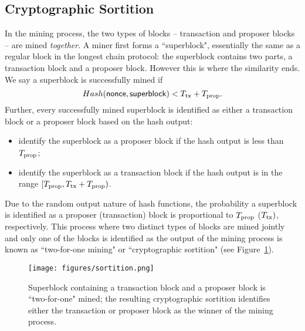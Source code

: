 \documentclass{article}
\begin{document}
\subsection*{Cryptographic Sortition}
In the mining process, the two types of blocks -- transaction and proposer blocks -- are mined {\em together}. A miner first forms a ``superblock", essentially the same as a regular block in the longest chain protocol: the superblock contains two parts, a  transaction block and a  proposer block.   However this is where the similarity ends. We say a superblock is successfully  mined if 
\begin{equation}
    Hash({\sf nonce}, {\sf superblock}) < T_{\rm tx} + T_{\rm prop}. 
\label{eq:sortition}
\end{equation}
Further, every successfully mined superblock is identified as either a transaction block or a proposer block based on the hash output: 
\begin{itemize}
    \item 
identify the superblock as a proposer block if the hash output is less than $T_{\rm prop}$; 
\item identify the superblock as a transaction block if the hash output is in the range $[T_{\rm prop}, T_{\rm tx} + T_{\rm prop})$.
\end{itemize}
Due to the random output nature of hash functions, the probability a superblock is identified as a proposer (transaction)  block is proportional to $T_{\rm prop}$ ($T_{\rm tx})$, respectively. This process where two distinct types of blocks are mined jointly and only one of the blocks is identified as the output of the mining process is known as ``two-for-one mining" or ``cryptographic sortition" (see Figure~\ref{fig:sortition}). 

\begin{figure}
    \centering
    \texttt{[image: figures/sortition.png]}
    \caption{Superblock containing a transaction block and a  proposer block is ``two-for-one" mined; the resulting  cryptographic sortition identifies either the transaction or proposer block as the winner of the mining process.}
    \label{fig:sortition}
\end{figure}
\end{document}
